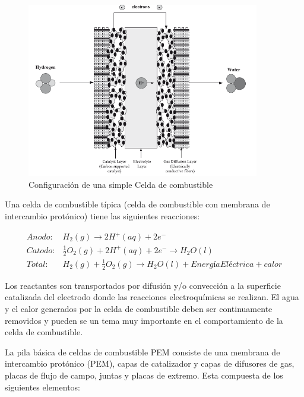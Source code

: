 \documentclass[12pt]{book}
\theoremstyle{definition}
\theoremstyle{remark}
\theoremstyle{plain}
\begin{document}
\begin{figure}
\centering
\includegraphics[width=4in]{Celdasdecombustible.png}
\caption{Configuración de una simple  Celda de combustible}
\label{fig1}
\end{figure}

Una celda de combustible típica (celda de combustible con membrana de intercambio protónico) tiene las siguientes reacciones:


\begin{align*}
Anodo: & H_2 (g) \rightarrow 2 H^{+}(aq)+2 e^{-} \\
Catodo: & \frac{1}{2} O_2 (g) + 2 H^{+}(aq)+2 e^{-} \rightarrow H_{2} O (l) \\
Total: & H_2(g) + \frac{1}{2} O_2 (g) \rightarrow H_{2}O (l)+ Energía Eléctrica+calor
\end{align*}


Los reactantes son transportados por difusión y/o convección a la superficie  catalizada del electrodo donde las reacciones electroquímicas se realizan. El agua y el calor 
generados por la celda de combustible deben ser continuamente removidos y pueden se un tema muy importante en el comportamiento de la celda de combustible.

La pila básica de celdas de combustible PEM consiste de una membrana de intercambio protónico (PEM), capas de  catalizador y  capas de difusores de gas, placas de flujo de 
campo, juntas y placas de extremo. Esta compuesta de los siguientes elementos:
\end{document}
